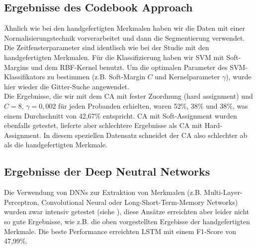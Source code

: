 \subsection{Ergebnisse des Codebook Approach} \label{ergebnisse-codebook-approach-subsec}


{\"A}hnlich wie bei den handgefertigten Merkmalen haben wir die Daten mit einer Normalisierungstechnik vorverarbeitet und dann die Segmentierung verwendet. Die Zeitfensterparameter sind identlisch wie bei der Studie mit den handgefertigten Merkmalen.
F{\"u}r die Klassifizierung haben wir SVM mit Soft-Margins und dem RBF-Kernel benutzt. 
Um die optimalen Parameter des SVM-Klassifikators zu bestimmen (z.B. Soft-Margin $C$ und Kernelparameter $\gamma$), wurde hier wieder die Gitter-Suche angewendet. \\


Die Ergebnisse, die wir mit dem CA mit fester Zuordnung (hard assignment) und $C = 8$, $\gamma = 0,002$ f{\"u}r jeden Probanden erhielten, waren 52\%, 38\% und 38\%, was einem Durchschnitt von 42,67\% entspricht. CA mit Soft-Assignment wurden ebenfalls getestet, lieferte aber schlechtere Ergebnisse als CA mit Hard-Assignment. In diesem speziellen Datensatz schneidet der CA also schlechter ab als die handgefertigten Merkmale.








\subsection{Ergebnisse der Deep Neutral Networks} \label{ergebnisse-dnn}

Die Verwendung von DNNs zur Extraktion von Merkmalen (z.B. Multi-Layer-Perceptron, Convolutional Neural oder Long-Short-Term-Memory Networks) wurden zwar intensiv getestet (siehe \cite{bscschnieber18}), diese Ansätze erreichten aber leider nicht so gute Ergebnisse, wie z.B. die oben vorgestellten Ergebisse der handgefertigten Merkmale. Die beste Performance erreichten LSTM mit einem F1-Score von 47,99\%. \\
